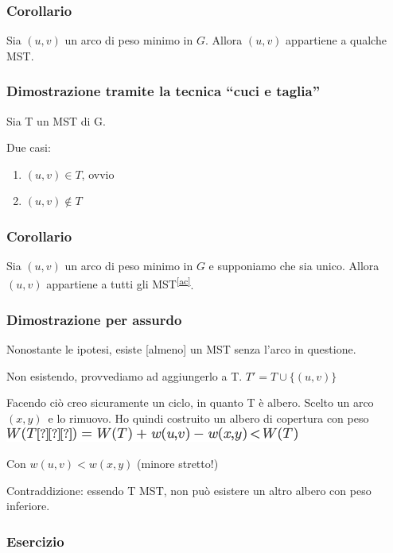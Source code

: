 \documentclass{article}
\providecommand{\tightlist}{%
  \setlength{\itemsep}{0pt}\setlength{\parskip}{0pt}}
\begin{document}
\subsubsection{Corollario}

{Sia $(u,v)$ un arco di peso minimo in $G$. Allora $(u,v)$ appartiene a qualche MST.}

\subsubsection{Dimostrazione tramite la tecnica ``cuci e taglia''}

{Sia T un MST di G. }

{Due casi:}

\begin{enumerate}
\tightlist
\item
  $(u,v)\in T${, ovvio}
\item
  $(u,v)\notin T$
\end{enumerate}

\subsubsection{Corollario}

{Sia $(u,v)$ un arco di peso minimo in $G$ e supponiamo che sia unico. Allora $(u,v)$ appartiene a tutti gli MST}\textsuperscript{\protect\hyperlink{cmnt29}{{[}ac{]}}}{.}

\subsubsection{Dimostrazione per assurdo}

{Nonostante le ipotesi, esiste {[}almeno{]} un MST senza l'arco in
questione.}

{Non esistendo, provvediamo ad aggiungerlo a T. $T' = T \cup \{(u,v)\}$}

{Facendo ciò creo sicuramente un ciclo, in quanto T è albero. Scelto un
arco }$(x,y)${~e lo rimuovo. Ho quindi
costruito un albero di copertura con peso
}\includegraphics{images/image470.png}

{Con $w(u,v) < w(x,y)$ (minore stretto!)}

{Contraddizione}{: essendo T MST, non può esistere un altro albero con
peso inferiore.}

\subsubsection{Esercizio}
\end{document}
